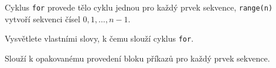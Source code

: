 %
%
%

\begin{reminder}
  Cyklus \texttt{for} provede tělo cyklu jednou pro každý prvek sekvence,
  \texttt{range(n)} vytvoří sekvenci čísel $0, 1, \dots, n-1$.
\end{reminder}

\begin{task}[title=Zahřívací otázka, points=2, answer=lines, lines=3]
  Vysvětlete vlastními slovy, k čemu slouží cyklus \texttt{for}.

  \begin{solution}
    Slouží k opakovanému provedení bloku příkazů pro každý prvek sekvence.
  \end{solution}
\end{task}

